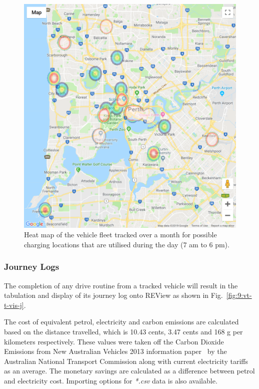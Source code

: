 
\begin{figure}[H]
	\centering
	\includegraphics[width=0.8\linewidth]{vt-t-vis-hm}
	\caption[Heat map of the vehicle fleet tracked over a month]{Heat map of the vehicle fleet tracked over a month for possible charging locations that are utilised during the day (7 am to 6 pm).}
	\label{fig:9:vt-t-vis-hm}
\end{figure}

\subsubsection{Journey Logs}
The completion of any drive routine from a tracked vehicle will result in the tabulation and display of its journey log onto REView as shown in Fig.~\ref{fig:9:vt-t-vis-j}.

The cost of equivalent petrol, electricity and carbon emissions are calculated based on the distance travelled, which is 10.43 cents, 3.47 cents and 168 g per kilometers respectively. These values were taken off the Carbon Dioxide Emissions from New Australian Vehicles 2013 information paper~\cite{national_transport_commission_carbon_2014} by the Australian National Transport Commission along with current electricity tariffs as an average. The monetary savings are calculated as a difference between petrol and electricity cost. Importing options for \textit{*.csv} data is also available.

